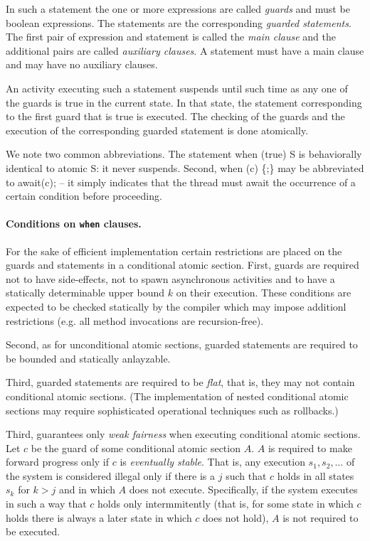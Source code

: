 {{In such a statement the one or more expressions are called {\em
guards} and must be {\cf boolean} expressions. The statements are the
corresponding {\em guarded statements}. The first pair of expression
and statement is called the {\em main clause} and the additional pairs
are called {\em auxiliary clauses}. A statement must have a main
clause and may have no auxiliary clauses.

An activity executing such a statement suspends until such time as any
one of the guards is true in the current state. In that state, the
statement corresponding to the first guard that is true is executed.
The checking of the guards and the execution of the corresponding
guarded statement is done atomically. 

We note two common abbreviations. The statement {\cf when (true) S} is
behaviorally identical to {\cf atomic S}: it never suspends. Second,
{\cf when (c) \{;\}} may be abbreviated to {\cf await(c);} -- it
simply indicates that the thread must await the occurrence of a
certain condition before proceeding.  

\paragraph{Conditions on {\tt when} clauses.} 

For the sake of efficient implementation certain restrictions are
placed on the guards and statements in a conditional atomic
section. First, guards are required not to have side-effects, not to
spawn asynchronous activities and to have a statically determinable
upper bound $k$ on their execution. These conditions are expected to
be checked statically by the compiler which may impose additionl
restrictions (e.g.{} all method invocations are recursion-free).

Second, as for unconditional atomic sections, guarded statements are
required to be bounded and statically anlayzable.

Third, guarded statements are required to be {\em flat}, that is, they
may not contain conditional atomic sections. (The implementation of
nested conditional atomic sections may require sophisticated
operational techniques such as rollbacks.)

Third, \Xten{} guarantees only {\em weak fairness} when executing
conditional atomic sections. Let $c$ be the guard of some conditional
atomic section $A$. $A$ is required to make forward progress only if
$c$ is {\em eventually stable}. That is, any execution $s_1, s_2,
\ldots$ of the system is considered illegal only if there is a $j$
such that $c$ holds in all states $s_k$ for $k > j$ and in which $A$
does not execute. Specifically, if the system executes in such a way
that $c$ holds only intermmitently (that is, for some state in which
$c$ holds there is always a later state in which $c$ does not hold),
$A$ is not required to be executed.

}}

